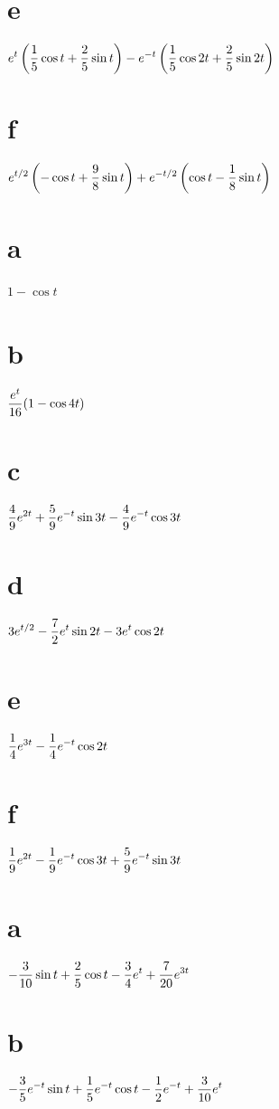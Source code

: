 \quad\;
 \part{e} $\displaystyle{e^{t}\left(\frac{1}{5}\cos t+\frac{2}{5}
\sin t\right)
-e^{-t}\left(\frac{1}{5}\cos2t+\frac{2}{5}\sin2t\right)}$\;
 \part{f} $\displaystyle{e^{t/2}\left(-\cos t+\frac{9}{8}\sin
t\right)+e^{-t/2}\left(\cos t-\frac{1}{8}\sin t\right)}$

 \part{a} $1-\cos t$\;
\part{b} $\displaystyle{\frac{e^{t}}{16}(1-\cos4t)}$\;
 \part{c} $\displaystyle{\frac{4}{9}e^{2t}+\frac{5}{9}e^{-t}
\sin3t-\frac{4}{9}e^{-t}\cos3t}$
\part{d} $\displaystyle{3e^{t/2}-\frac{7}{2}e^{t}\sin2t-3e^{t}\cos2t}$

\quad\;
 \part{e} $\displaystyle{\frac{1}{4}e^{3t}-\frac{1}{4}e^{-t}\cos
2t}$\;
\part{f} $\displaystyle{\frac{1}{9}e^{2t}-\frac{1}{9}e^{-t}\cos3t+\frac{5}{9}e^{-t}\sin3t}$

\;
 \part{a} $\displaystyle{-\frac{3}{10}\sin t+\frac{2}{5}\cos t-
\frac{3}{4}e^{t}+\frac{7}{20}e^{3t}}$\;
\part{b} $\displaystyle{-\frac{3}{5}e^{-t}\sin t+\frac{1}{5}
e^{-t}\cos t-\frac{1}{2}e^{-t}+\frac{3}{10}e^{t}}$\;

